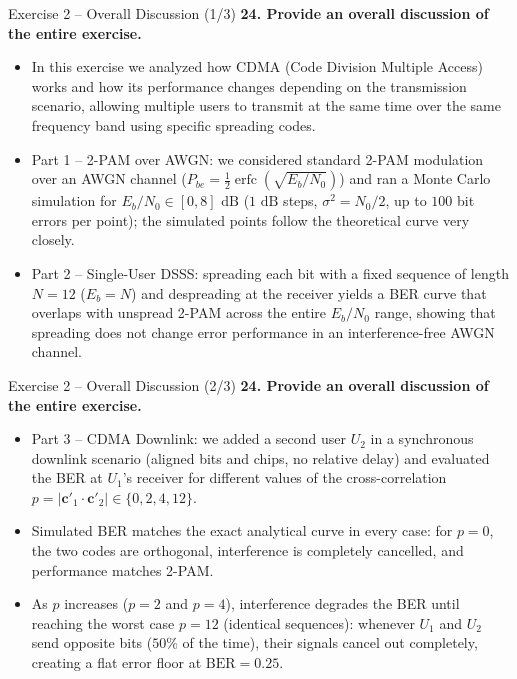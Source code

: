 \documentclass[10pt, aspectratio=169]{beamer}
\newcommand{\question}[1]{{\color{QuestionRed}\textbf{#1}}}
\begin{document}
	\begin{frame}{Exercise 2 -- Overall Discussion (1/3)}
		\question{24. Provide an overall discussion of the entire exercise.}
		
		\vspace{0.1cm}
		\begin{itemize}
			\item In this exercise we analyzed how CDMA (Code Division Multiple Access) works and how its performance changes depending on the transmission scenario, allowing multiple users to transmit at the same time over the same frequency band using specific spreading codes.
			\item Part 1 -- 2-PAM over AWGN: we considered standard 2-PAM modulation over an AWGN channel ($P_{be} = \frac{1}{2}\operatorname{erfc}\!\left(\sqrt{E_b/N_0}\right)$) and ran a Monte Carlo simulation for $E_b/N_0 \in [0, 8]\text{ dB}$ ($1\text{ dB}$ steps, $\sigma^2 = N_0/2$, up to $100$ bit errors per point); the simulated points follow the theoretical curve very closely.
			\item Part 2 -- Single-User DSSS: spreading each bit with a fixed sequence of length $N = 12$ ($E_b = N$) and despreading at the receiver yields a BER curve that overlaps with unspread 2-PAM across the entire $E_b/N_0$ range, showing that spreading does not change error performance in an interference-free AWGN channel.
		\end{itemize}
		
	\end{frame}
	
	\begin{frame}{Exercise 2 -- Overall Discussion (2/3)}
		\question{24. Provide an overall discussion of the entire exercise.}
		
		\vspace{0.1cm}
		\begin{itemize}
			\item Part 3 -- CDMA Downlink: we added a second user $U_2$ in a synchronous downlink scenario (aligned bits and chips, no relative delay) and evaluated the BER at $U_1$'s receiver for different values of the cross-correlation $p = |\mathbf{c}'_1 \cdot \mathbf{c}'_2| \in \{0, 2, 4, 12\}$.
			\item Simulated BER matches the exact analytical curve in every case: for $p = 0$, the two codes are orthogonal, interference is completely cancelled, and performance matches 2-PAM.
			\item As $p$ increases ($p = 2$ and $p = 4$), interference degrades the BER until reaching the worst case $p = 12$ (identical sequences): whenever $U_1$ and $U_2$ send opposite bits ($50\%$ of the time), their signals cancel out completely, creating a flat error floor at $\text{BER} = 0.25$.
		\end{itemize}
		
	\end{frame}
	
\end{document}
